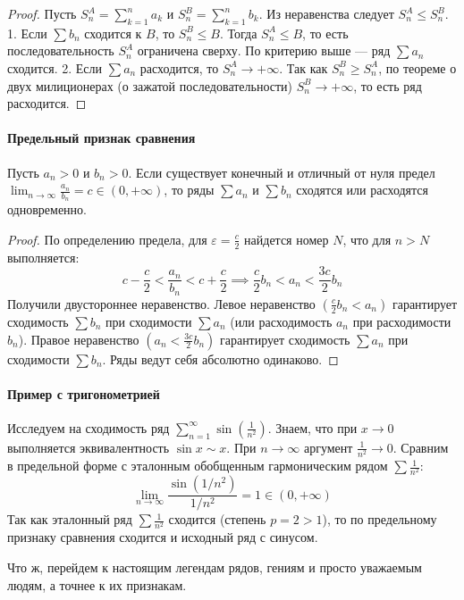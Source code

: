 \begin{proof}
Пусть $S_n^A = \sum_{k=1}^n a_k$ и $S_n^B = \sum_{k=1}^n b_k$. Из неравенства следует $S_n^A \le S_n^B$.
1. Если $\sum b_n$ сходится к $B$, то $S_n^B \le B$. Тогда $S_n^A \le B$, то есть последовательность $S_n^A$ ограничена сверху. По критерию выше — ряд $\sum a_n$ сходится.
2. Если $\sum a_n$ расходится, то $S_n^A \to +\infty$. Так как $S_n^B \ge S_n^A$, по теореме о двух милиционерах (о зажатой последовательности) $S_n^B \to +\infty$, то есть ряд расходится.
\end{proof}

\paragraph{Предельный признак сравнения}
Пусть $a_n > 0$ и $b_n > 0$. Если существует конечный и отличный от нуля предел $\lim_{n \to \infty} \frac{a_n}{b_n} = c \in (0, +\infty)$, то ряды $\sum a_n$ и $\sum b_n$ сходятся или расходятся одновременно.

\begin{proof}
По определению предела, для $\varepsilon = \frac{c}{2}$ найдется номер $N$, что для $n > N$ выполняется:
$$ c - \frac{c}{2} < \frac{a_n}{b_n} < c + \frac{c}{2} \implies \frac{c}{2} b_n < a_n < \frac{3c}{2} b_n $$
Получили двустороннее неравенство. 
Левое неравенство $\left(\frac{c}{2} b_n < a_n\right)$ гарантирует сходимость $\sum b_n$ при сходимости $\sum a_n$ (или расходимость $a_n$ при расходимости $b_n$). 
Правое неравенство $\left(a_n < \frac{3c}{2} b_n\right)$ гарантирует сходимость $\sum a_n$ при сходимости $\sum b_n$. 
Ряды ведут себя абсолютно одинаково.
\end{proof}

\paragraph{Пример с тригонометрией}
Исследуем на сходимость ряд $\sum_{n=1}^\infty \sin\left(\frac{1}{n^2}\right)$. 
Знаем, что при $x \to 0$ выполняется эквивалентность $\sin x \sim x$. При $n \to \infty$ аргумент $\frac{1}{n^2} \to 0$. Сравним в предельной форме с эталонным обобщенным гармоническим рядом $\sum \frac{1}{n^2}$:
$$ \lim_{n \to \infty} \frac{\sin(1/n^2)}{1/n^2} = 1 \in (0, +\infty) $$
Так как эталонный ряд $\sum \frac{1}{n^2}$ сходится (степень $p=2 > 1$), то по предельному признаку сравнения сходится и исходный ряд с синусом.

Что ж, перейдем к настоящим легендам рядов, гениям и просто уважаемым людям, а точнее к их признакам.


